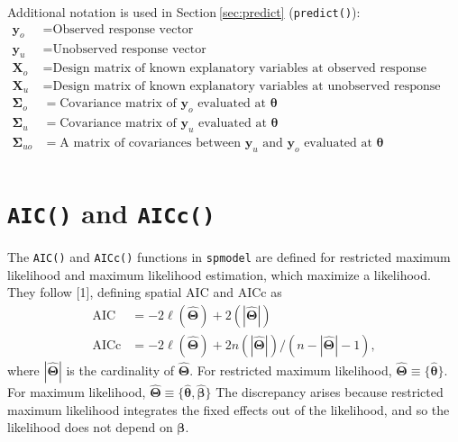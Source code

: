 \documentclass[10pt,letterpaper]{article}
\begin{document}
Additional notation is used in Section\(~\)\ref{sec:predict}
(\texttt{predict()}): \begin{equation*}
  \begin{split}
   \mathbf{y}_o & = \text{Observed response vector} \\
   \mathbf{y}_u & = \text{Unobserved response vector} \\
   \mathbf{X}_o & = \text{Design matrix of known explanatory variables at observed response variable locations} \\
   \mathbf{X}_u & = \text{Design matrix of known explanatory variables at unobserved response variable locations} \\
   \boldsymbol{\Sigma}_o & = \text{Covariance matrix of $\mathbf{y}_o$ evaluated at } \boldsymbol{\theta} \\
   \boldsymbol{\Sigma}_u & = \text{Covariance matrix of $\mathbf{y}_u$ evaluated at } \boldsymbol{\theta} \\
   \boldsymbol{\Sigma}_{uo} & = \text{A matrix of covariances between $\mathbf{y}_u$ and $\mathbf{y}_o$ evaluated at } \boldsymbol{\theta} \\
  \end{split}
\end{equation*}

\hypertarget{sec:aic}{%
\section{\texorpdfstring{\texttt{AIC()} and
\texttt{AICc()}}{AIC() and AICc()}}\label{sec:aic}}

The \texttt{AIC()} and \texttt{AICc()} functions in \texttt{spmodel} are
defined for restricted maximum likelihood and maximum likelihood
estimation, which maximize a likelihood. They follow {[}1{]}, defining
spatial AIC and AICc as \begin{equation*}\label{eq:sp_aic}
  \begin{split}
    \text{AIC} & = -2\ell(\hat{\boldsymbol{\Theta}}) + 2(|\hat{\boldsymbol{\Theta}}|) \\
    \text{AICc} & = -2\ell(\hat{\boldsymbol{\Theta}}) + 2n(|\hat{\boldsymbol{\Theta}}|) / (n - |\hat{\boldsymbol{\Theta}}| - 1),
  \end{split}
\end{equation*} where \(|\hat{\boldsymbol{\Theta}}|\) is the cardinality
of \(\hat{\boldsymbol{\Theta}}\). For restricted maximum likelihood,
\(\hat{\boldsymbol{\Theta}} \equiv \{\hat{\boldsymbol{\theta}}\}\). For
maximum likelihood,
\(\hat{\boldsymbol{\Theta}} \equiv \{\hat{\boldsymbol{\theta}}, \hat{\boldsymbol{\beta}}\}\)
The discrepancy arises because restricted maximum likelihood integrates
the fixed effects out of the likelihood, and so the likelihood does not
depend on \(\boldsymbol{\beta}\).
\end{document}
